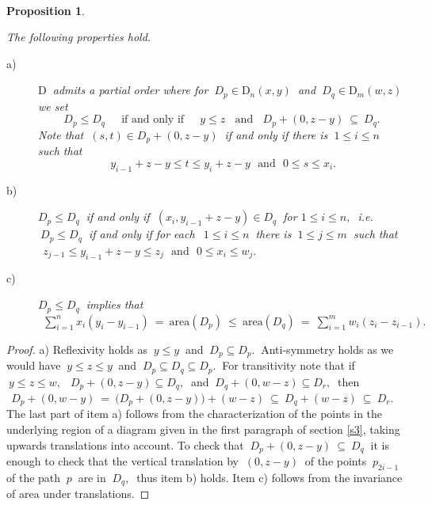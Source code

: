 \documentclass[10pt,leqeq]{article}
\newtheorem{prop}[thm]{Proposition} %
\begin{document}
\

\begin{prop}\label{k}
{\em  The following properties hold.
\begin{description} 
  \item[a)] $ \mathrm{D} \  $ admits a partial order where  for $\ D_p \in \mathrm{D}_n(x,y)\ $ and $ \ D_q \in \mathrm{D}_m(w,z) \ $ we set 
  $$\ D_p \leq D_q \ \ \ \ \ \mbox{ if and only if } 
  \ \ \ \ \ y \leq z \ \ \ \ \mbox{and} \ \ \ \ D_p + (0,z-y) \ \subseteq \  D_q. \ $$
  Note that $ \ (s,t) \in D_p + (0,z-y) \ $ if and only if
 there is  $\ 1 \leq i \leq n \ $ such that 
  $$\  y_{i-1}+z-y \leq t \leq y_{i}+z-y\ \ \ \mbox{and} \ \ \ 
    0 \leq s \leq x_i.$$
    
  \item[b)] $D_p \leq D_q \ $ if and only if $\ (x_i,y_{i-1}+z-y) \in D_q  \ $
  for $1 \leq i \leq n, \ $ i.e.  $\ D_p \leq D_q \ $ if and only if
  for each $\ \ 1 \leq i \leq n \ $ there is $ \ 1 \leq j \leq m \  $ such that
  $\ \  z_{j-1} \leq y_{i-1}+z-y \leq z_j\ \ \ \mbox{and}
    \ \ \ 0 \leq x_i \leq w_j.$ 

  \item[c)] $ D_p \leq D_q \ $ implies that 
  $\ \ \displaystyle \sum_{i=1}^{n}x_i(y_i-y_{i-1}) \ = \ \mathrm{area}(D_p)\ \leq \ \mathrm{area}(D_q) \ = \ \sum_{i=1}^{m}w_i(z_i-z_{i-1}).$ 

\end{description}
}
\end{prop}



\begin{proof} 
 a) Reflexivity holds as $ \ y \leq y \ $ and $\ D_p \subseteq D_p. \ $ 
 Anti-symmetry holds as we would have $ \ y \leq z \leq y \ $ and 
 $\ D_p \subseteq D_q \subseteq D_p. \ $ For transitivity note that
 if $ \ y\leq z\leq w, \ $   $ \ D_p + (0,z-y)\subseteq D_q, \ $ and
 $\ D_q + (0,w-z) \subseteq D_r, \ $ then
 $ \ \ D_p + (0,w-y)\ = \ \big(D_p + (0,z-y)\big)+(w-z)\ \subseteq \ D_q +(w-z) \ \subseteq \ D_r.\ \ $
  The last part of item a) follows from the characterization of the points in the underlying region of a diagram given in the first paragraph of section \ref{s3}, taking upwards translations into account.  To check that
 $\ D_p + (0,z-y) \ \subseteq \  D_q \ $ it is enough to check that the vertical translation by $\ (0,z-y) \ $ of the points $ \ p_{2i-1} \ $ of the path $\ p\ $ are in   $\  D_q, \ $ thus item b) holds. Item c) follows from the invariance of area under translations.
\end{proof}
\end{document}
